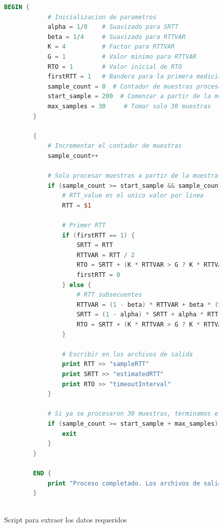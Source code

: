 \begin{figure}[H]
    \centering
    \begin{lstlisting}[frame=single, breaklines=true, basicstyle=\footnotesize\ttfamily, breakatwhitespace=false, 
        columns=flexible, tabsize=2, showstringspaces=false, language=AWK] 
        BEGIN {
            # Inicializacion de parametros
            alpha = 1/8    # Suavizado para SRTT
            beta = 1/4     # Suavizado para RTTVAR
            K = 4          # Factor para RTTVAR
            G = 1          # Valor minimo para RTTVAR
            RTO = 1        # Valor inicial de RTO
            firstRTT = 1   # Bandera para la primera medicion RTT
            sample_count = 0  # Contador de muestras procesadas
            start_sample = 200  # Comenzar a partir de la muestra 200
            max_samples = 30     # Tomar solo 30 muestras
        }
        
        {
            # Incrementar el contador de muestras
            sample_count++
        
            # Solo procesar muestras a partir de la muestra 200
            if (sample_count >= start_sample && sample_count < start_sample + max_samples) {
                # RTT_value es el unico valor por linea
                RTT = $1
        
                # Primer RTT
                if (firstRTT == 1) {
                    SRTT = RTT
                    RTTVAR = RTT / 2
                    RTO = SRTT + (K * RTTVAR > G ? K * RTTVAR : G)
                    firstRTT = 0
                } else {
                    # RTT subsecuentes
                    RTTVAR = (1 - beta) * RTTVAR + beta * (SRTT > RTT ? SRTT - RTT : RTT - SRTT)
                    SRTT = (1 - alpha) * SRTT + alpha * RTT
                    RTO = SRTT + (K * RTTVAR > G ? K * RTTVAR : G)
                }
        
                # Escribir en los archivos de salida
                print RTT >> "sampleRTT"
                print SRTT >> "estimatedRTT"
                print RTO >> "timeoutInterval"
            }
        
            # Si ya se procesaron 30 muestras, terminamos el script
            if (sample_count >= start_sample + max_samples) {
                exit
            }
        }
        
        END {
            print "Proceso completado. Los archivos de salida son: sampleRTT, EstimatedRTT, TimeoutInterval."
        }
        
    \end{lstlisting}
    \caption{Script para extraer los datos requeridos}
    \label{fig:scriptAWK}
\end{figure}


